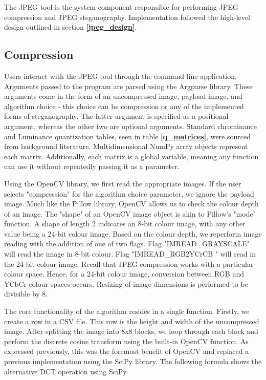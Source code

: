 \documentclass{l4proj}
\begin{document}
The JPEG tool is the system component responsible for performing JPEG compression and JPEG steganography. Implementation followed the high-level design outlined in section \textbf{\ref{jpeg_design}}. 

\subsection{Compression}

Users interact with the JPEG tool through the command line application. Arguments passed to the program are parsed using the Argparse library. These arguments come in the form of an uncompressed image, payload image, and algorithm choice - this choice can be compression or any of the implemented forms of steganography. The latter argument is specified as a positional argument, whereas the other two are optional arguments. Standard chrominance and Luminance quantization tables, seen in table \textbf{\ref{q_matrices}}, were sourced from background literature. Multidimensional NumPy array objects represent each matrix. Additionally, each matrix is a global variable, meaning any function can use it without repeatedly passing it as a parameter.

Using the OpenCV library, we first read the appropriate images. If the user selects "compression" for the algorithm choice parameter, we ignore the payload image. Much like the Pillow library, OpenCV allows us to check the colour depth of an image. The "shape" of an OpenCV image object is akin to Pillow's "mode" function. A shape of length 2 indicates an 8-bit colour image, with any other value being a 24-bit colour image. Based on the colour depth, we reperform image reading with the addition of one of two flags. Flag "IMREAD\_GRAYSCALE" will read the image in 8-bit colour. Flag "IMREAD\_RGB2YCrCB " will read in the 24-bit colour image. Recall that JPEG compression works with a particular colour space. Hence, for a 24-bit colour image, conversion between RGB and YCbCr colour spaces occurs. Resizing of image dimensions is performed to be divisible by 8. 

The core functionality of the algorithm resides in a single function. Firstly, we create a row in a CSV file. This row is the height and width of the uncompressed image. After splitting the image into 8x8 blocks, we loop through each block and perform the discrete cosine transform using the built-in OpenCV function. As expressed previously, this was the foremost benefit of OpenCV and replaced a previous implementation using the SciPy library. The following formula shows the alternative DCT operation using SciPy.
\end{document}
